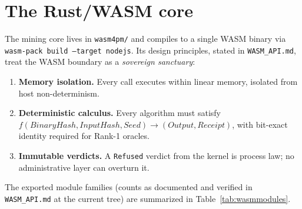 \documentclass[11pt,oneside]{report}
\begin{document}
\section{The Rust/WASM core}

The mining core lives in \texttt{wasm4pm/} and compiles to a single WASM
binary via \texttt{wasm-pack build --target nodejs}. Its design principles,
stated in \texttt{WASM\_API.md}, treat the WASM boundary as a
\emph{sovereign sanctuary}:

\begin{enumerate}
  \item \textbf{Memory isolation.} Every call executes within linear
  memory, isolated from host non-determinism.
  \item \textbf{Deterministic calculus.} Every algorithm must satisfy
  $f(\mathit{BinaryHash}, \mathit{InputHash}, \mathit{Seed}) \to
  (\mathit{Output}, \mathit{Receipt})$, with bit-exact identity required
  for Rank-1 oracles.
  \item \textbf{Immutable verdicts.} A \texttt{Refused} verdict from the
  kernel is process law; no administrative layer can overturn it.
\end{enumerate}

The exported module families (counts as documented and verified in
\texttt{WASM\_API.md} at the current tree) are summarized in
Table~\ref{tab:wasmmodules}.
\end{document}
